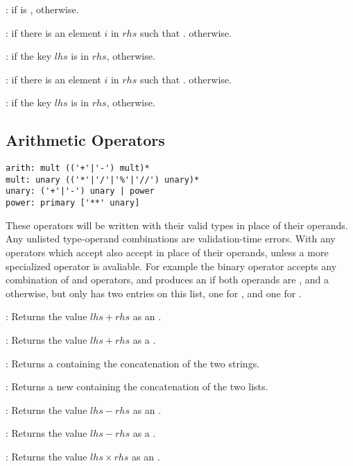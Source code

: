 :  if  is , 
otherwise.

:  if there is an element $i$ in $rhs$ such that
.  otherwise.

:  if the key $lhs$ is in $rhs$, 
otherwise.

:  if there is an element $i$ in $rhs$ such that
.  otherwise.

:  if the key $lhs$ is in $rhs$, 
otherwise.

\subsection{Arithmetic Operators}
\begin{lstlisting}
arith: mult (('+'|'-') mult)*
mult: unary (('*'|'/'|'%'|'//') unary)*
unary: ('+'|'-') unary | power
power: primary ['**' unary]
\end{lstlisting}

These operators will be written with their valid types in place of their
operands. Any unlisted type-operand combinations are validation-time errors.
With any operators which accept  also accept  in place of
their operands, unless a more specialized operator is avaliable. For example
the \code{-} binary operator accepts any combination of  and
 operators, and produces an  if both operands are
, and a  otherwise, but only has two entries on this list,
one for , and one for .

: Returns the value $lhs + rhs$ as an .

: Returns the value $lhs + rhs$ as a .

: Returns a  containing the concatenation of the two strings.

\code{[T] + [T]}: Returns a new \code{[T]} containing the concatenation of the two lists.

: Returns the value $lhs - rhs$ as an .

: Returns the value $lhs - rhs$ as a .

: Returns the value $lhs \times rhs$ as an .

